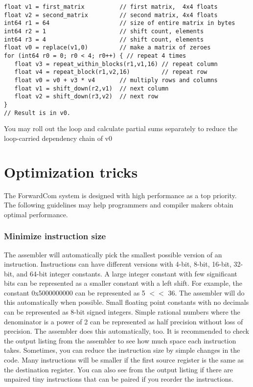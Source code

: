 \documentclass[forwardcom.tex]{subfiles}
\begin{document}
\begin{example}
\label{exampleMatrixMultiplication}
\end{example}
\begin{lstlisting}[frame=single]
float v1 = first_matrix          // first matrix,  4x4 floats
float v2 = second_matrix         // second matrix, 4x4 floats
int64 r1 = 64                    // size of entire matrix in bytes
int64 r2 = 1                     // shift count, elements
int64 r3 = 4                     // shift count, elements
float v0 = replace(v1,0)         // make a matrix of zeroes
for (int64 r0 = 0; r0 < 4; r0++) { // repeat 4 times
   float v3 = repeat_within_blocks(r1,v1,16) // repeat column
   float v4 = repeat_block(r1,v2,16)         // repeat row
   float v0 = v0 + v3 * v4       // multiply rows and columns
   float v1 = shift_down(r2,v1)  // next column
   float v2 = shift_down(r3,v2)  // next row
}
// Result is in v0.
\end{lstlisting}
\vspace{2mm}
You may roll out the loop and calculate partial sums separately to
reduce the loop-carried dependency chain of v0
\vspace{2mm}



\section{Optimization tricks}
\label{OptimizationTricks}

The ForwardCom system is designed with high performance as a top priority. The following guidelines may help programmers and compiler makers obtain optimal performance.

\subsubsection{Minimize instruction size}
The assembler will automatically pick the smallest possible version of an instruction. 
Instructions can have different versions with 4-bit, 8-bit, 16-bit, 32-bit, and 64-bit integer constants. 
A large integer constant with few significant bits can be represented as a smaller constant with a left shift. For example, the constant 0x5000000000 can be represented as 5 $<<$ 36. The assembler will do this automatically when possible.
Small floating point constants with no decimals can be represented as 8-bit signed integers. Simple rational numbers where the denominator is a power of 2 can be represented as half precision without loss of precision. The assembler does this automatically, too.
It is recommended to check the output listing from the assembler to see 
how much space each instruction takes. Sometimes, you can reduce the instruction size by simple changes in the code. Many instructions will be smaller if the first source register is the same as the destination register. You can also see from the output listing if there are unpaired tiny instructions that can be paired if you reorder the instructions.
\end{document}
